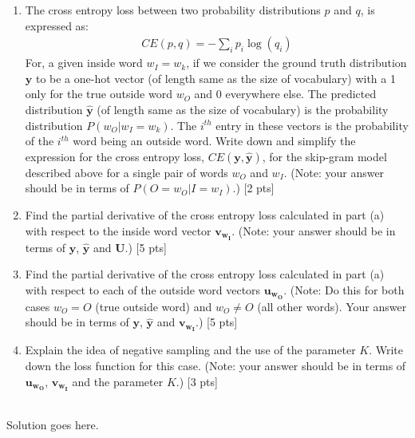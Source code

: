 \begin{enumerate}
    \item The cross entropy loss between two probability distributions $p$ and $q$, is expressed as:
        \begin{align}
            CE(p, q) = - \sum_i p_i \log(q_i)
        \end{align}
        For, a given inside word $w_I = w_k$, if we consider the ground truth distribution $\bm{y}$ to be a one-hot vector (of length same as the size of vocabulary) with a 1 only for the true outside word $w_O$ and 0 everywhere else. The predicted distribution $\hat{\bm{y}}$ (of length same as the size of vocabulary) is the probability distribution $P(w_O | w_I = w_k)$. The $i^{th}$ entry in these vectors is the probability of the $i^{th}$ word being an outside word. Write down and simplify the expression for the cross entropy loss, $CE(\bm{y}, \hat{\bm{y}})$, for the skip-gram model described above for a single pair of words $w_O$ and $w_I$. (Note: your answer should be in terms of $P(O = w_O | I = w_I)$.) [2 pts]
    \item Find the partial derivative of the cross entropy loss calculated in part (a) with respect to the inside word vector $\bm{v_{w_I}}$. (Note: your answer should be in terms of $\bm{y}$, $\hat{\bm{y}}$ and $\textbf{U}$.) [5 pts]
    \item Find the partial derivative of the cross entropy loss calculated in part (a) with respect to each of the outside word vectors $\bm{u_{w_O}}$. (Note: Do this for both cases $w_O = O$ (true outside word) and $w_O \neq O$ (all other words). Your answer should be in terms of $\bm{y}$, $\hat{\bm{y}}$ and $\bm{v_{w_I}}$.) [5 pts]
    \item Explain the idea of negative sampling and the use of the parameter $K$. Write down the loss function for this case. (Note: your answer should be in terms of $\bm{u_{w_O}}$, $\bm{v_{w_I}}$ and the parameter $K$.) [3 pts]
\end{enumerate}


\begin{solution} \ \\
Solution goes here.
\end{solution}